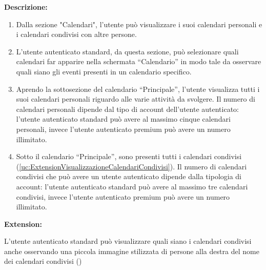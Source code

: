 \begin{listaPersonale}[UC]{}
    \textbf{Descrizione:}
    \begin{enumerate}
        \item Dalla sezione "Calendari", l'utente può visualizzare i suoi calendari personali e i calendari condivisi con altre persone.
        \item L'utente autenticato standard, da questa sezione, può selezionare quali calendari far apparire nella schermata “Calendario” in modo tale da osservare quali siano gli eventi presenti in un calendario specifico.
        \item Aprendo la sottosezione del calendario “Principale”, l'utente visualizza tutti i suoi calendari personali riguardo alle varie attività da svolgere. Il numero di calendari personali dipende dal tipo di account dell'utente autenticato: l'utente autenticato standard può avere al massimo cinque calendari personali, invece l'utente autenticato premium può avere un numero illimitato.
        \item Sotto il calendario “Principale”, sono presenti tutti i calendari condivisi (\ref{uc:ExtensionVisualizzazioneCalendariCondivisi}). Il numero di calendari condivisi che può avere un utente autenticato dipende dalla tipologia di account: l'utente autenticato standard può avere al massimo tre calendari condivisi, invece l'utente autenticato premium può avere un numero illimitato.
    \end{enumerate}


    \textbf{Extension:}
    \begin{enumerate}[label=\textbf{[extension \arabic{enumii}]}, ref= \textbf{[extension \arabic{enumii}]}]
         L'utente autenticato standard può visualizzare quali siano i calendari condivisi anche osservando una piccola immagine stilizzata di persone alla destra del nome dei calendari condivisi ()
    \end{enumerate}




    \newpage


\end{listaPersonale}
